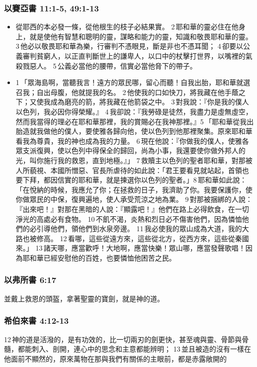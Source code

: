 \subsubsection{以賽亞書 11:1-5, 49:1-13}
\begin{itemize} 
\itemsep-.25em
\item 從耶西的本必發一條，從他根生的枝子必結果實。 2 耶和華的靈必住在他身上，就是使他有智慧和聰明的靈，謀略和能力的靈，知識和敬畏耶和華的靈。 3 他必以敬畏耶和華為樂，行審判不憑眼見，斷是非也不憑耳聞； 4 卻要以公義審判貧窮人，以正直判斷世上的謙卑人，以口中的杖擊打世界，以嘴裡的氣殺戮惡人。 5 公義必當他的腰帶，信實必當他脅下的帶子。
\item 1 「眾海島啊，當聽我言！遠方的眾民哪，留心而聽！自我出胎，耶和華就選召我；自出母腹，他就提我的名。 2 他使我的口如快刀，將我藏在他手蔭之下；又使我成為磨亮的箭，將我藏在他箭袋之中。 3 對我說：『你是我的僕人以色列，我必因你得榮耀。』 4 我卻說：『我勞碌是徒然，我盡力是虛無虛空，然而我當得的理必在耶和華那裡，我的賞賜必在我神那裡。』5 「耶和華從我出胎造就我做他的僕人，要使雅各歸向他，使以色列到他那裡聚集。原來耶和華看我為尊貴，我的神也成為我的力量。 6 現在他說：『你做我的僕人，使雅各眾支派復興，使以色列中得保全的歸回，尚為小事，我還要使你做外邦人的光，叫你施行我的救恩，直到地極。』」 7 救贖主以色列的聖者耶和華，對那被人所藐視、本國所憎惡、官長所虐待的如此說：「君王要看見就站起，首領也要下拜，都因信實的耶和華，就是揀選你以色列的聖者。」8 耶和華如此說：「在悅納的時候，我應允了你；在拯救的日子，我濟助了你。我要保護你，使你做眾民的中保，復興遍地，使人承受荒涼之地為業。 9 對那被捆綁的人說：『出來吧！』對那在黑暗的人說：『顯露吧！』他們在路上必得飲食，在一切淨光的高處必有食物。 10 不飢不渴，炎熱和烈日必不傷害他們，因為憐恤他們的必引導他們，領他們到水泉旁邊。 11 我必使我的眾山成為大道，我的大路也被修高。 12 看哪，這些從遠方來，這些從北方，從西方來，這些從秦國來。」 13 諸天哪，應當歡呼！大地啊，應當快樂！眾山哪，應當發聲歌唱！因為耶和華已經安慰他的百姓，也要憐恤他困苦之民。
\end{itemize}

\subsubsection{以弗所書 6:17}
並戴上救恩的頭盔，拿著聖靈的寶劍，就是神的道。

\subsubsection{希伯來書 4:12-13}
12 神的道是活潑的，是有功效的，比一切兩刃的劍更快，甚至魂與靈、骨節與骨髓，都能刺入、剖開，連心中的思念和主意都能辨明； 13 並且被造的沒有一樣在他面前不顯然的，原來萬物在那與我們有關係的主眼前，都是赤露敞開的

